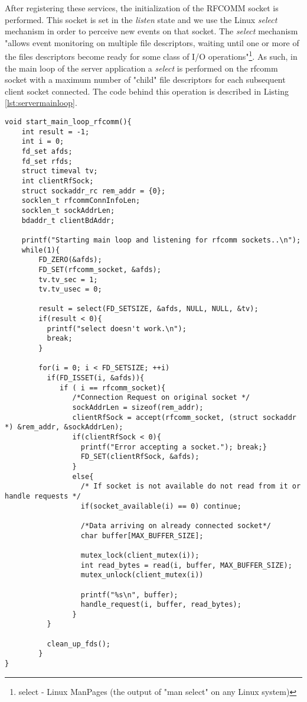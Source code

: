 After registering these services, the initialization of the RFCOMM socket is performed. This socket is set in the \textit{listen} state and we use the Linux \textit{select}\cite{ostrowski2000mechanism} mechanism in order to perceive new events on that socket. The \textit{select} mechanism "allows event monitoring on multiple file descriptors, waiting until one or more of the files descriptors become ready for some class of I/O operations"\footnote{select - Linux ManPages (the output of "man select" on any Linux system)}. As such, in the main loop of the server application a \textit{select} is performed on the rfcomm socket with a maximum number of "child" file descriptors for each subsequent client socket connected. The code behind this operation is described in Listing \ref{lst:servermainloop}.

\lstset{language=c,caption=Main Loop of BLEOffloadingFramework server, label=lst:servermainloop}
\begin{lstlisting}
void start_main_loop_rfcomm(){
    int result = -1;
    int i = 0;
    fd_set afds;
    fd_set rfds;
    struct timeval tv;
    int clientRfSock;
    struct sockaddr_rc rem_addr = {0};
    socklen_t rfcommConnInfoLen;
    socklen_t sockAddrLen;
    bdaddr_t clientBdAddr;

    printf("Starting main loop and listening for rfcomm sockets..\n");
    while(1){
        FD_ZERO(&afds);
        FD_SET(rfcomm_socket, &afds);
        tv.tv_sec = 1;
        tv.tv_usec = 0;

        result = select(FD_SETSIZE, &afds, NULL, NULL, &tv);
        if(result < 0){
          printf("select doesn't work.\n");
          break;
        }

        for(i = 0; i < FD_SETSIZE; ++i)
          if(FD_ISSET(i, &afds)){
             if ( i == rfcomm_socket){
                /*Connection Request on original socket */
                sockAddrLen = sizeof(rem_addr);
                clientRfSock = accept(rfcomm_socket, (struct sockaddr *) &rem_addr, &sockAddrLen);
                if(clientRfSock < 0){
                  printf("Error accepting a socket."); break;}
                  FD_SET(clientRfSock, &afds);
                }
                else{
                  /* If socket is not available do not read from it or handle requests */
                  if(socket_available(i) == 0) continue;
                  
                  /*Data arriving on already connected socket*/
                  char buffer[MAX_BUFFER_SIZE];
                  
                  mutex_lock(client_mutex(i));
                  int read_bytes = read(i, buffer, MAX_BUFFER_SIZE);
                  mutex_unlock(client_mutex(i))
                  
                  printf("%s\n", buffer);
                  handle_request(i, buffer, read_bytes);
                }
          }
          
          clean_up_fds();
        }
}
\end{lstlisting}


